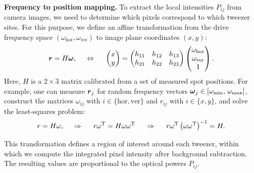 
\textbf{Frequency to position mapping.}
To extract the local intensities $P_{ij}$ from camera images, we need to determine which pixels correspond to which tweezer sites. For this purpose, we define an affine transformation from the drive frequency space $(\omega_{\mathrm{hor}}, \omega_{\mathrm{ver}})$ to image plane coordinates $(x, y)$:
\begin{equation*}
    \boldsymbol{r} = H \boldsymbol{\omega},
    \hspace{5 mm} \Leftrightarrow \hspace{5 mm} 
    \begin{pmatrix}
        x \\ y
    \end{pmatrix} = \begin{pmatrix}
        h_{11} & h_{12} & h_{13} \\
        h_{21} & h_{22} & h_{23}
    \end{pmatrix} 
    \begin{pmatrix}
        \omega_{\textnormal{hor}} \\
        \omega_{\textnormal{ver}} \\
        1
    \end{pmatrix}.
\end{equation*}
Here, $H$ is a $2 \times 3$ matrix calibrated from a set of measured spot positions. For example, one can measure $\boldsymbol{r}_j$ for random frequency vectors $\boldsymbol{\omega}_j \in [\omega_{\mathrm{min}},\, \omega_{\mathrm{max}}]$, construct the matrices $\omega_{ij}$ with $i \in \{\mathrm{hor}, \mathrm{ver}\}$ and $r_{ij}$ with $i \in \{x, y\}$, and solve the least-squares problem:
\begin{equation}
    r = H \omega,
    \hspace{0.5cm} \Rightarrow \hspace{0.5cm}
    r \omega^\mathrm{T} = H \omega \omega^\mathrm{T}
    \hspace{0.5cm} \Rightarrow \hspace{0.5cm}
    r \omega^\mathrm{T} \left(\omega \omega^\mathrm{T}\right)^{-1} = H.
    \label{eq:linreg-freq2pos}
\end{equation}

This transformation defines a region of interest around each tweezer, within which we compute the integrated pixel intensity after background subtraction. The resulting values are proportional to the optical powers $P_{ij}$.

